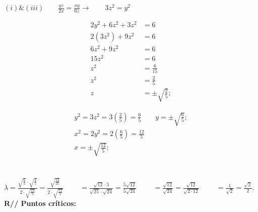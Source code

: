 \documentclass[13pt]{memoir}
\begin{document}
\begin{enumerate}
$\left(i\right) \& \left(iii\right)\qquad \frac{yz}{2x} = \frac{xy}{6z}  \rightarrow\qquad 3z^2 = y^2$\\
\noindent
\begin{minipage}[t]{0.5\textwidth}
   \begin{align*}
   	2y^2 + 6z^2 + 3z^2 &= 6 \\
    2(3z^2) + 9z^2 &= 6 \\
    6z^2 + 9z^2 &= 6 \\
    15z^2 &= 6 \\
    z^2 &= \frac{6}{15} \\
    z^2 &= \frac{2}{5} \\
    z &= \pm \sqrt{\frac{2}{5}};
   \end{align*}
\end{minipage}%
\hfill
\begin{minipage}[t]{0.5\textwidth} 
   \begin{align*}
   	y^2 = 3z^2 = 3 \left(\frac{2}{5}\right) = \frac{6}{5} \qquad y = \pm \sqrt{\frac{6}{5}};\\
   	x^2 = 2y^2 = 2 \left(\frac{6}{5}\right) = \frac{12}{5} \\
	x = \pm \sqrt{\frac{12}{5}};\\
    \end{align*}
\end{minipage}\\


    

$\lambda = \frac{\sqrt{\frac{6}{5}} \cdot \sqrt{\frac{2}{5}}}{2 \cdot \sqrt{\frac{12}{5}}} 
= \frac{\sqrt{\frac{12}{25}}}{2 \cdot \sqrt{\frac{12}{5}}} \qquad$ 
$= \frac{\sqrt{12} \cdot 5}{\sqrt{25} \cdot \sqrt{24}} = \frac{5\sqrt{12}}{5\sqrt{24}} \qquad$ 
$= \frac{\sqrt{12}}{\sqrt{24}} = \frac{\sqrt{12}}{\sqrt{2 \cdot 12}} \qquad$ 
$= \frac{1}{\sqrt{2}} = \frac{\sqrt{2}}{2}.$\\

\textbf{R// Puntos críticos: }\\


\end{enumerate}
\end{document}
